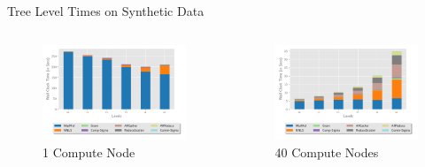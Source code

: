 \documentclass{beamer}
\begin{document}
\begin{frame}{Tree Level Times on Synthetic Data}
    \centering
    \begin{columns}
        \begin{column}{0.5\textwidth}
            \begin{figure}
            \includegraphics[width=\textwidth]{../plots/synthetic_sequential_level_breakdown.pdf}
            \caption{1 Compute Node}
            \end{figure}
        \end{column}
        \begin{column}{0.5\textwidth}
            \begin{figure}
            \includegraphics[width=\textwidth]{../plots/synthetic_parallel_level_breakdown.pdf}
            \caption{40 Compute Nodes}
            \end{figure}
        \end{column}
    \end{columns}


\end{frame}
\end{document}

